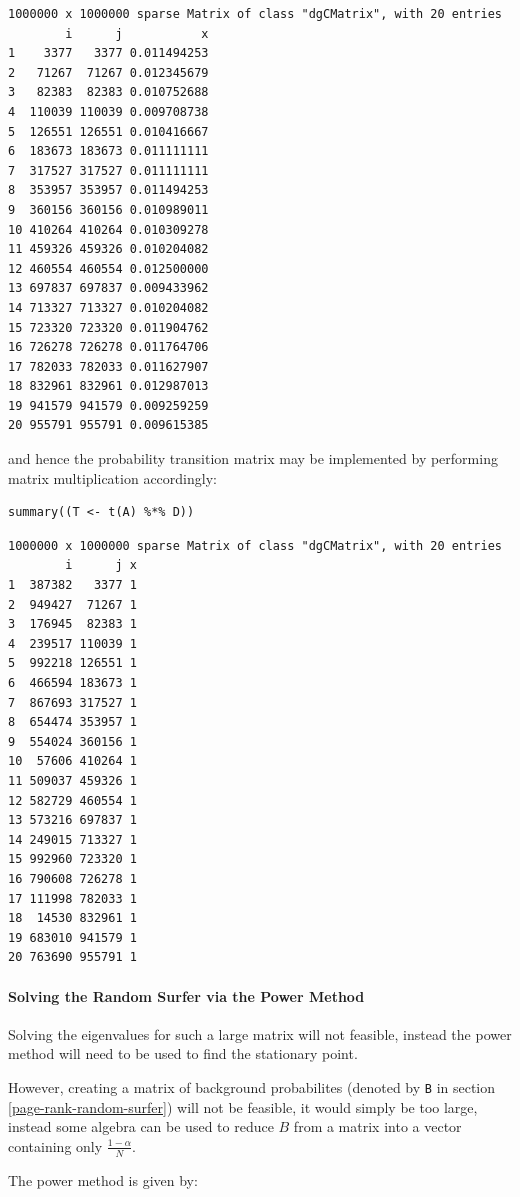 \documentclass[11pt]{article}
\begin{document}
\begin{verbatim}
1000000 x 1000000 sparse Matrix of class "dgCMatrix", with 20 entries
        i      j           x
1    3377   3377 0.011494253
2   71267  71267 0.012345679
3   82383  82383 0.010752688
4  110039 110039 0.009708738
5  126551 126551 0.010416667
6  183673 183673 0.011111111
7  317527 317527 0.011111111
8  353957 353957 0.011494253
9  360156 360156 0.010989011
10 410264 410264 0.010309278
11 459326 459326 0.010204082
12 460554 460554 0.012500000
13 697837 697837 0.009433962
14 713327 713327 0.010204082
15 723320 723320 0.011904762
16 726278 726278 0.011764706
17 782033 782033 0.011627907
18 832961 832961 0.012987013
19 941579 941579 0.009259259
20 955791 955791 0.009615385
\end{verbatim}

and hence the probability transition matrix may be implemented by performing matrix multiplication accordingly:

\begin{verbatim}
summary((T <- t(A) %*% D))
\end{verbatim}

\begin{verbatim}
1000000 x 1000000 sparse Matrix of class "dgCMatrix", with 20 entries
        i      j x
1  387382   3377 1
2  949427  71267 1
3  176945  82383 1
4  239517 110039 1
5  992218 126551 1
6  466594 183673 1
7  867693 317527 1
8  654474 353957 1
9  554024 360156 1
10  57606 410264 1
11 509037 459326 1
12 582729 460554 1
13 573216 697837 1
14 249015 713327 1
15 992960 723320 1
16 790608 726278 1
17 111998 782033 1
18  14530 832961 1
19 683010 941579 1
20 763690 955791 1
\end{verbatim}

\paragraph{Solving the Random Surfer via the Power Method}
\label{random-surfer-sparse-fix}
Solving the eigenvalues for such a large matrix will not feasible, instead the power method will need to be used to find the stationary point.

However, creating a matrix of background probabilites (denoted by \texttt{B} in section \ref{page-rank-random-surfer}) will not be feasible, it would simply be too large, instead some algebra can be used to reduce \(B\) from a matrix into a vector containing only \(\frac{1-\alpha}{N}\).

The power method is given by:
\end{document}
